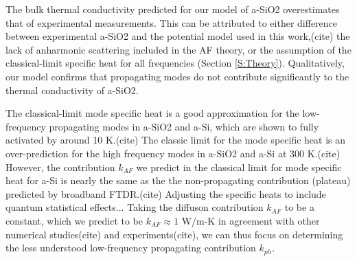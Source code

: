 \documentclass[aps,prb,twocolumn,superscriptaddress,footinbib,amsmath,amssymb,floatfix]{revtex4}
\begin{document}
The bulk thermal conductivity predicted for our model of a-SiO2 overestimates 
that of experimental measurements.\cite{regner_broadband_2013} This can be 
attributed to either difference between experimental a-SiO2 and the 
potential model used in this work,(cite) the lack of anharmonic scattering 
included in the AF theory,\cite{feldman_thermal_1993} or the assumption 
of the classical-limit specific heat for all frequencies 
(Section \ref{S:Theory}). Qualitatively, 
our model confirms that propagating modes do not contribute significantly 
to the thermal conductivity of a-SiO2.
 
The classical-limit mode specific heat is a good approximation 
for the low-frequency propagating modes in a-SiO2 and a-Si, which are shown to 
fully activated by around 10 K.(cite) 
The classic limit for the mode specific heat is 
an over-prediction for the high frequency modes in a-SiO2 and a-Si at 300 K.(cite) 
However, the contribution $k_{AF}$ we predict in the classical limit 
for mode specific heat for a-Si is nearly the same as the 
the non-propagating contribution (plateau) predicted by broadband FTDR.(cite) 
Adjusting the specific heats to include quantum statistical effects...
Taking the diffuson contribution $k_{AF}$ to be a constant, which we predict 
to be $k_{AF} \approx 1$ W$/$m-K in agreement with other numerical 
studies(cite) and experiments(cite), 
we can thus focus on determining the less understood 
low-frequency propagating 
contribution $k_{ph}$. 
\end{document}
